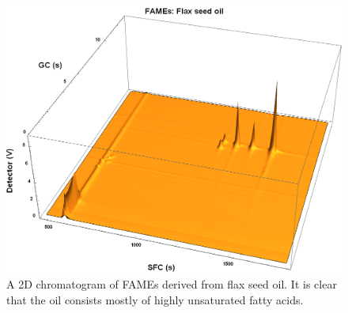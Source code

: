 \begin{figure}
\centering
\includegraphics[width=\textwidth]{Figures/Flax44.png}
\decoRule

\caption[SFC×GC of flax seed oil]{A 2D chromatogram of FAMEs derived from
flax seed oil. It is clear that the oil consists mostly of highly unsaturated fatty
acids.}

\label{fig:2DFlax}
\end{figure}




\todos